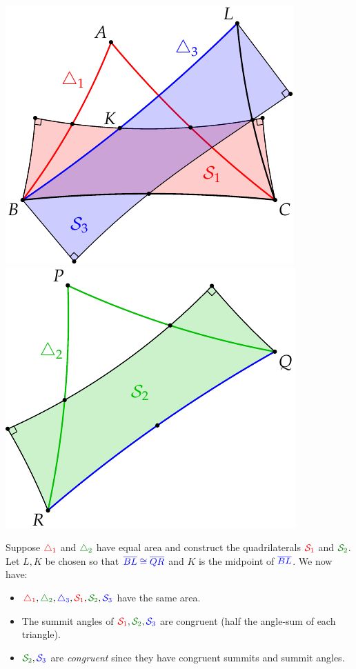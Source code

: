 \begin{center}
\includegraphics{area-saccheri10}\qquad\qquad\includegraphics{area-saccheri8}
\end{center}

Suppose $\textcolor{red}{\triangle_1}$ and $\textcolor{Green}{\triangle_2}$ have equal area and construct the quadrilaterals $\textcolor{red}{\mathcal{S}_1}$ and $\textcolor{Green}{\cS_2}$. Let $L,K$ be chosen so that $\textcolor{blue}{\overline{BL}\cong\overline{QR}}$ and $K$ is the midpoint of $\textcolor{blue}{\overline{BL}}$. We now have:
\begin{itemize}
  \item $\textcolor{red}{\triangle_1}, \textcolor{Green}{\triangle_2}, \textcolor{blue}{\triangle_3}, \textcolor{red}{\cS_1}, \textcolor{Green}{\cS_2}, \textcolor{blue}{\cS_3}$ have the same area.
  \item The summit angles of $\textcolor{red}{\cS_1}, \textcolor{Green}{\cS_2}, \textcolor{blue}{\cS_3}$ are congruent (half the angle-sum of each triangle).
  \item $\textcolor{Green}{\cS_2}, \textcolor{blue}{\cS_3}$ are \emph{congruent} since they have congruent summits and summit angles.
\end{itemize}


